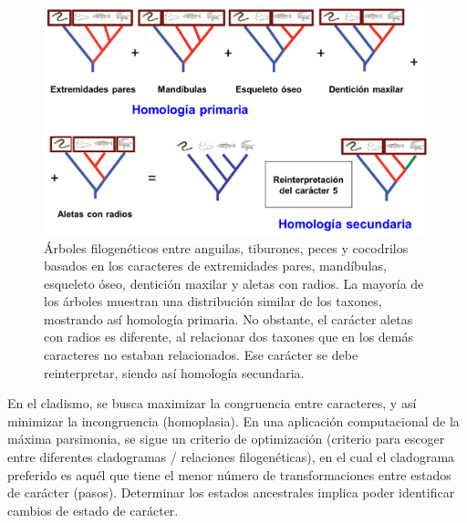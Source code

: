 \begin{figure}[htbp]
\centering
\includegraphics[width=0.5\linewidth]{figs/homologia-primaria-secundaria.png}
\caption{Árboles filogenéticos entre anguilas, tiburones, peces y cocodrilos basados en los caracteres de extremidades pares, mandíbulas, esqueleto óseo, dentición maxilar y aletas con radios. La mayoría de los árboles muestran una distribución similar de los taxones, mostrando así homología primaria. No obstante, el carácter aletas con radios es diferente, al relacionar dos taxones que en los demás caracteres no estaban relacionados. Ese carácter se debe reinterpretar, siendo así homología secundaria.}
\end{figure}

En el cladismo, se busca maximizar la congruencia entre caracteres, y así minimizar la incongruencia (homoplasia). En una aplicación computacional de la máxima parsimonia, se sigue un criterio de optimización (criterio para escoger entre diferentes cladogramas / relaciones filogenéticas), en el cual el cladograma preferido es aquél que tiene el menor número de transformaciones entre estados de carácter (pasos). Determinar los estados ancestrales implica poder identificar cambios de estado de carácter.


